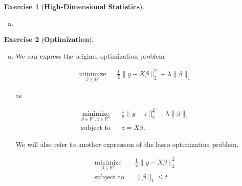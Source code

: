 \documentclass{article}
\theoremstyle{definition}
\newtheorem{exercise}{Exercise}
\newtheorem*{remark}{Remark}
\theoremstyle{definition}
\theoremstyle{definition}
\theoremstyle{definition}
\theoremstyle{definition}
\begin{document}
\begin{exercise}[\textbf{High-Dimensional Statistics}]
\begin{enumerate}[(a)]
\begin{remark}
\[
\hat{\omega}_{12} = - \hat{\Sigma}_{11}^{-1} \hat{\sigma}_{12} \hat{\omega}_{22}, \qquad \hat{\omega}_{22} = 1/ \left( \hat{\sigma}_{22} - \hat{\sigma}_{12}^T \hat{\Sigma}_{11}^{-1} \hat{\sigma}_{12} \right).
\]

Then using \(\hat{\sigma}_{12} = \hat{\Sigma}_{11} \hat{\beta} \iff \hat{\beta} =  \hat{\Sigma}_{11} ^{-1} \hat{\sigma}_{12}\), we have (\ref{2018.screen.4.c.precision.matrix.formula}).
\end{remark}

\item

\end{enumerate}

\end{exercise}

\begin{exercise}[\textbf{Optimization}]

\begin{enumerate}[(a)]

\item We can express the original optimization problem

\begin{equation}\label{2018.screen.5.a.objective}
\begin{aligned}
& \underset{\beta \in \mathbb{R}^p}{\text{minimize}}
& & \frac{1}{2} \lVert y - X \beta \rVert_2^2 + \lambda \lVert \beta \rVert_1
\end{aligned}
\end{equation}

as 

\begin{equation}\label{2018.screen.5.a.objective.alt}
\begin{aligned}
& \underset{\beta \in \mathbb{R}^p, z \in \mathbb{R}^n}{\text{minimize}}
& & \frac{1}{2} \lVert y - z \rVert_2^2 + \lambda \lVert \beta \rVert_1 \\
& \text{subject to}
& & z = X \beta.
\end{aligned}
\end{equation}

We will also refer to another expression of the lasso optimization problem,

\begin{equation}\label{2018.screen.5.a.objective.orig}
\begin{aligned}
& \underset{\beta \in \mathbb{R}^p}{\text{minimize}}
& & \frac{1}{2} \lVert y - X \beta \rVert_2^2 \\
& \text{subject to}
& & \lVert\beta \rVert_1 \leq t
\end{aligned}
\end{equation}


\end{enumerate}
\end{exercise}
\end{document}
